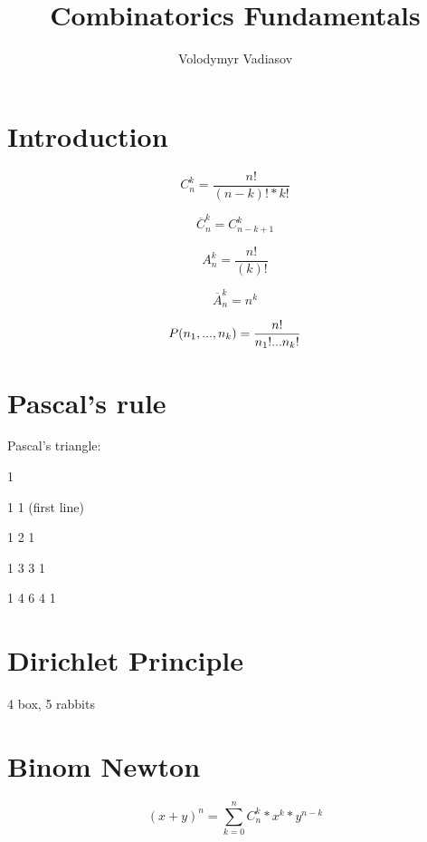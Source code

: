 \documentclass{exam}
\author{Volodymyr Vadiasov}
\title{Combinatorics Fundamentals}
\theoremstyle{definition}
\begin{document}
    \maketitle

    \section{Introduction}\label{sec:introduction}

    \begin{equation}
        C^k_{n} = \frac{n!}{(n-k)!* k!}
    \end{equation}

    \begin{equation}
        \overline{C}^k_{n} = C^k_{n-k+1}
    \end{equation}

    \begin{equation}
        A^k_{n} = \frac{n!}{(k)!}
    \end{equation}

    \begin{equation}
        \overline{A}^k_{n} = n^k
    \end{equation}

    \begin{equation}
        P(n_1, ..., n_k)= \frac{n!}{n_1! \text... n_k!}
    \end{equation}

    \section{Pascal's rule} \label{sec:Pascal's rule}
    Pascal's triangle:

    1

    1 1  (first line)

    1 2 1

    1 3 3 1

    1 4 6 4 1

    \section{Dirichlet Principle} \label{sec:Dirichlet Principle}
    4 box, 5 rabbits

    \section{Binom Newton} \label{sec:Binom Newton}
    \begin{equation}
        (x+y)^n = \sum_{k=0}^n C^k_n * x^k * y^{n-k}
    \end{equation}
\end{document}
